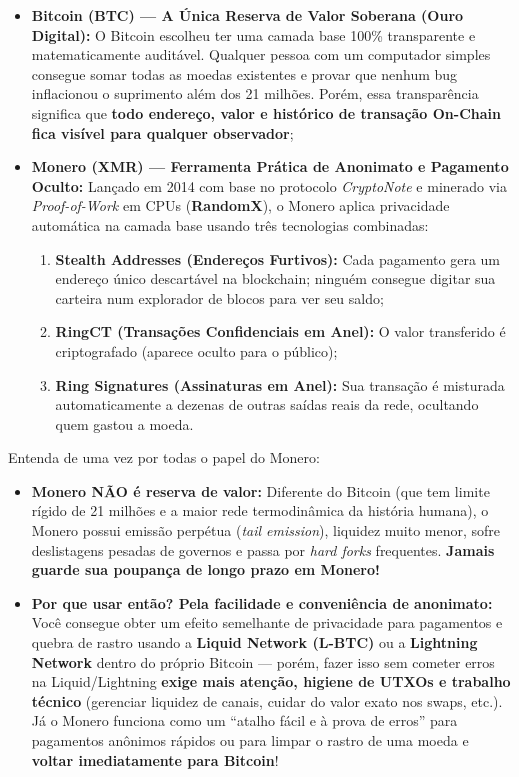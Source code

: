 \documentclass{pousadaguide}
\begin{document}
\begin{itemize}
  \item \textbf{Bitcoin (BTC) — A Única Reserva de Valor Soberana (Ouro Digital):} O Bitcoin escolheu ter uma camada base 100\% transparente e matematicamente auditável. Qualquer pessoa com um computador simples consegue somar todas as moedas existentes e provar que nenhum bug inflacionou o suprimento além dos 21 milhões. Porém, essa transparência significa que \textbf{todo endereço, valor e histórico de transação On-Chain fica visível para qualquer observador};
  \item \textbf{Monero (XMR) — Ferramenta Prática de Anonimato e Pagamento Oculto:} Lançado em 2014 com base no protocolo \emph{CryptoNote} e minerado via \emph{Proof-of-Work} em CPUs (\textbf{RandomX}), o Monero aplica privacidade automática na camada base usando três tecnologias combinadas:
  \begin{enumerate}
    \item \textbf{Stealth Addresses (Endereços Furtivos):} Cada pagamento gera um endereço único descartável na blockchain; ninguém consegue digitar sua carteira num explorador de blocos para ver seu saldo;
    \item \textbf{RingCT (Transações Confidenciais em Anel):} O valor transferido é criptografado (aparece oculto para o público);
    \item \textbf{Ring Signatures (Assinaturas em Anel):} Sua transação é misturada automaticamente a dezenas de outras saídas reais da rede, ocultando quem gastou a moeda.
  \end{enumerate}
\end{itemize}

\begin{atencao}
Entenda de uma vez por todas o papel do Monero:
\begin{itemize}
  \item \textbf{Monero NÃO é reserva de valor:} Diferente do Bitcoin (que tem limite rígido de 21 milhões e a maior rede termodinâmica da história humana), o Monero possui emissão perpétua (\emph{tail emission}), liquidez muito menor, sofre deslistagens pesadas de governos e passa por \emph{hard forks} frequentes. \textbf{Jamais guarde sua poupança de longo prazo em Monero!}
  \item \textbf{Por que usar então? Pela facilidade e conveniência de anonimato:} Você consegue obter um efeito semelhante de privacidade para pagamentos e quebra de rastro usando a \textbf{Liquid Network (L-BTC)} ou a \textbf{Lightning Network} dentro do próprio Bitcoin — porém, fazer isso sem cometer erros na Liquid/Lightning \textbf{exige mais atenção, higiene de UTXOs e trabalho técnico} (gerenciar liquidez de canais, cuidar do valor exato nos swaps, etc.). Já o Monero funciona como um ``atalho fácil e à prova de erros'' para pagamentos anônimos rápidos ou para limpar o rastro de uma moeda e \textbf{voltar imediatamente para Bitcoin}!
\end{itemize}
\end{atencao}
\end{document}

